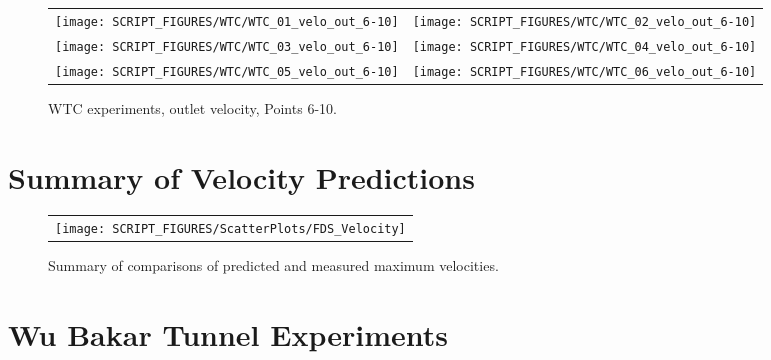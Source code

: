 \begin{figure}[p]
\begin{tabular*}{\textwidth}{l@{\extracolsep{\fill}}r}
\texttt{[image: SCRIPT\_FIGURES/WTC/WTC\_01\_velo\_out\_6-10]} &
\texttt{[image: SCRIPT\_FIGURES/WTC/WTC\_02\_velo\_out\_6-10]} \\
\texttt{[image: SCRIPT\_FIGURES/WTC/WTC\_03\_velo\_out\_6-10]} &
\texttt{[image: SCRIPT\_FIGURES/WTC/WTC\_04\_velo\_out\_6-10]} \\
\texttt{[image: SCRIPT\_FIGURES/WTC/WTC\_05\_velo\_out\_6-10]} &
\texttt{[image: SCRIPT\_FIGURES/WTC/WTC\_06\_velo\_out\_6-10]}
\end{tabular*}
\caption[WTC experiments, outlet velocity, Points 6-10]{WTC experiments, outlet velocity, Points 6-10.}
\label{WTC_velo_out_6-10}
\end{figure}



\clearpage

\section{Summary of Velocity Predictions}
\label{Velocity}

\begin{figure}[h!]
\begin{center}
\begin{tabular}{l}
\texttt{[image: SCRIPT\_FIGURES/ScatterPlots/FDS\_Velocity]}
\end{tabular}
\end{center}
\caption[Summary of velocity predictions]
{Summary of comparisons of predicted and measured maximum velocities.}
\label{Steckler_Scatterplot}
\end{figure}

\clearpage

\section{Wu Bakar Tunnel Experiments}

